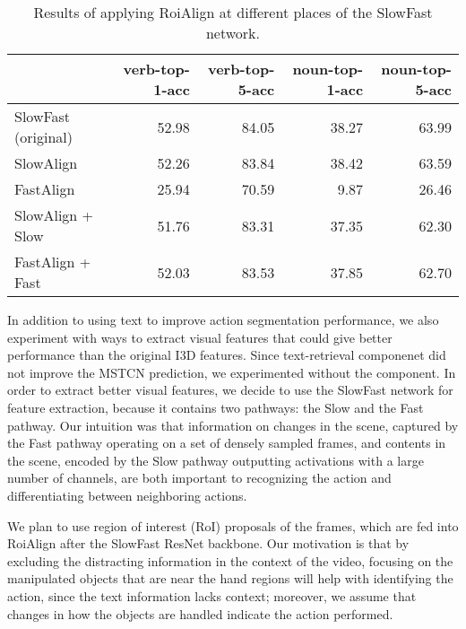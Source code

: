 
\begin{table*}[t]
\begin{center}
    \begin{minipage}[b]{1\textwidth}
    \centering
\begin{tabular}{lrrrr}
\toprule
  & verb-top-1-acc & verb-top-5-acc & noun-top-1-acc & noun-top-5-acc \\
\midrule
SlowFast (original) & 52.98 & 84.05 & 38.27 & 63.99 \\
\midrule
SlowAlign  & 52.26 & 83.84 & 38.42 & 63.59 \\
FastAlign & 25.94 & 70.59 & 9.87 & 26.46 \\
SlowAlign + Slow & 51.76 & 83.31 & 37.35 & 62.30 \\
FastAlign + Fast & 52.03 & 83.53 & 37.85 & 62.70 \\
\bottomrule
\end{tabular}
\caption{Results of applying RoiAlign at different places of the SlowFast network.}
\label{table:roi-results}
\end{minipage}
\end{center}
\end{table*}


In addition to using text to improve action segmentation performance, we also experiment with ways to extract visual features that could give better performance than the original I3D features. Since text-retrieval componenet did not improve the MSTCN prediction, we experimented without the component. In order to extract better visual features, we decide to use the SlowFast network \cite{feichtenhofer2019slowfast} for feature extraction, because it contains two pathways: the Slow and the Fast pathway.
Our intuition was that information on changes in the scene, captured by the Fast pathway operating on a set of densely sampled frames, and contents in the scene, encoded by the Slow pathway outputting activations with a large number of channels, are both important to recognizing the action and differentiating between neighboring actions. 

We plan to use region of interest (RoI) proposals of the frames, which are fed into RoiAlign after the SlowFast ResNet backbone. Our motivation is that by excluding the distracting information in the context of the video, focusing on the manipulated objects that are near the hand regions will help with identifying the action, since the text information lacks context; moreover, we assume that changes in how the objects are handled indicate the action performed. 

